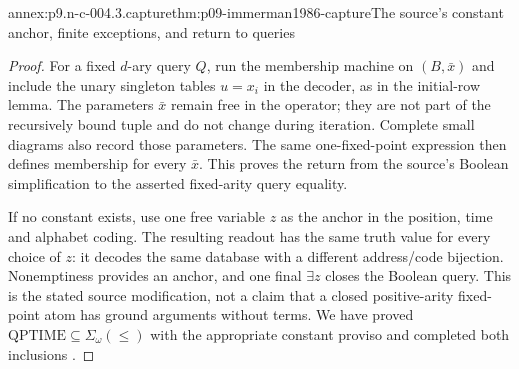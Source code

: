 \begin{annexitem}{annex:p9.n-c-004.3.capture}{thm:p09-immerman1986-capture}{The source's constant anchor, finite exceptions, and return to queries}
\begin{proof}
For a fixed \(d\)-ary query \(Q\), run the membership machine on
\((B,\bar x)\) and include the unary singleton tables \(u=x_i\)
in the decoder, as in the initial-row lemma.  The parameters \(\bar x\)
remain free in the operator; they are not part of the recursively bound
tuple and do not change during iteration.  Complete small diagrams also
record those parameters.  The same one-fixed-point expression then
defines membership for every \(\bar x\).  This proves the return
from the source's Boolean simplification to the asserted fixed-arity
query equality.

If no constant exists, use one free variable \(z\) as the anchor in
the position, time and alphabet coding.  The resulting readout has the
same truth value for every choice of \(z\): it decodes the same
database with a different address/code bijection.  Nonemptiness provides
an anchor, and one final \(\exists z\) closes the Boolean query.
This is the stated source modification, not a claim that a closed
positive-arity fixed-point atom has ground arguments without terms.
We have proved \(\mathrm{QPTIME}\subseteq\Sigma_\omega(\leq)\)
with the appropriate constant proviso and completed both inclusions
\cite[thm.~1 and its footnote~3]{Immerman1986}.
\end{proof}
\end{annexitem}

